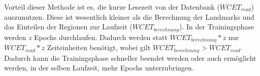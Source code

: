 Vorteil dieser Methode ist es, die kurze Lesezeit von der Datenbank ($WCET_{read}$) auszunutzen. Diese ist wesentlich kleiner als die Berechnung der Landmarks und das Einteilen der Regionen zur Laufzeit ($WCET_{berechnung}$). In der Trainingsphase werden $z$ Epochs durchlaufen. Dadurch werden statt  $WCET_{berechnung} * z$ nur $WCET_{read} * z$ Zeiteinheiten benötigt, wobei gilt $WCET_{berechnung} > WCET_{read}$. Dadurch kann die Trainingsphase schneller beendet werden oder auch ermöglicht werden, in der selben Laufzeit, mehr Epochs unterzubringen.
































